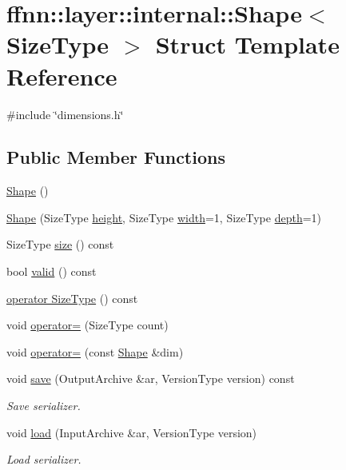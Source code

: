 \hypertarget{structffnn_1_1layer_1_1internal_1_1_shapeensions}{\section{ffnn\-:\-:layer\-:\-:internal\-:\-:Shape$<$ Size\-Type $>$ Struct Template Reference}
\label{structffnn_1_1layer_1_1internal_1_1_shapeensions}
}


{\ttfamily \#include \char`\"{}dimensions.\-h\char`\"{}}

\subsection*{Public Member Functions}
\begin{DoxyCompactItemize}
\item 
\hyperlink{structffnn_1_1layer_1_1internal_1_1_shapeensions_a44dfec485cbd9d3dc95ddd38319b1829}{Shape} ()
\item 
\hyperlink{structffnn_1_1layer_1_1internal_1_1_shapeensions_a6c07d0cdfc92bb13c34a1712c1e9f58b}{Shape} (Size\-Type \hyperlink{structffnn_1_1layer_1_1internal_1_1_shapeensions_a49348c4b65a649c9d55284e283bfa39e}{height}, Size\-Type \hyperlink{structffnn_1_1layer_1_1internal_1_1_shapeensions_a1fac884bf9c7468e9408143195afc989}{width}=1, Size\-Type \hyperlink{structffnn_1_1layer_1_1internal_1_1_shapeensions_a34216373e9d09bb79b05a90ef9cec53b}{depth}=1)
\item 
Size\-Type \hyperlink{structffnn_1_1layer_1_1internal_1_1_shapeensions_a55225c7e571ffb20efc454767bc598e1}{size} () const 
\item 
bool \hyperlink{structffnn_1_1layer_1_1internal_1_1_shapeensions_a62d2fa9411f32b8d2f3a197cf202ec53}{valid} () const 
\item 
\hyperlink{structffnn_1_1layer_1_1internal_1_1_shapeensions_a9f9e33a5d3c0e148f394364ca61e2b66}{operator Size\-Type} () const 
\item 
void \hyperlink{structffnn_1_1layer_1_1internal_1_1_shapeensions_aca4f4f99d5943256d7a4c66543839cb2}{operator=} (Size\-Type count)
\item 
void \hyperlink{structffnn_1_1layer_1_1internal_1_1_shapeensions_a7c62d6ad721cbdaf3352e63c0541df48}{operator=} (const \hyperlink{structffnn_1_1layer_1_1internal_1_1_shapeensions}{Shape} \&dim)
\item 
void \hyperlink{structffnn_1_1layer_1_1internal_1_1_shapeensions_a7516722990cfea99e376f41fb95847cb}{save} (Output\-Archive \&ar, Version\-Type version) const 
\begin{DoxyCompactList}\small\item\em Save serializer. \end{DoxyCompactList}\item 
void \hyperlink{structffnn_1_1layer_1_1internal_1_1_shapeensions_af342e32d3de83adb90abfb35991d8d32}{load} (Input\-Archive \&ar, Version\-Type version)
\begin{DoxyCompactList}\small\item\em Load serializer. \end{DoxyCompactList}\end{DoxyCompactItemize}
